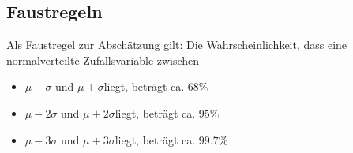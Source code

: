 \subsection{Faustregeln}

\hfill \break
Als Faustregel zur Abschätzung gilt: Die Wahrscheinlichkeit, dass eine normalverteilte Zufallsvariable zwischen \\
\begin{itemize}
    \item $\mu - \sigma$ und $\mu + \sigma$liegt, beträgt ca. $68\%$
    \item $\mu - 2\sigma$ und $\mu + 2\sigma$liegt, beträgt ca. $95\%$
    \item $\mu - 3\sigma$ und $\mu + 3\sigma$liegt, beträgt ca. $99.7\%$
\end{itemize}